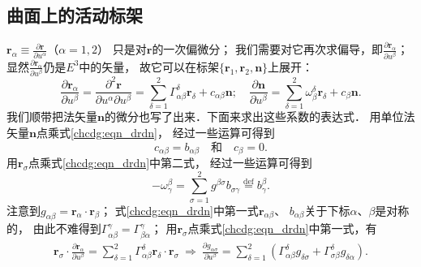 \subsection{曲面上的活动标架}
$\boldsymbol{r}_\alpha\equiv \frac{\partial \boldsymbol{r}}{\partial u^\alpha}$（$\alpha=1,2$）
只是对$\boldsymbol{r}$的一次偏微分；
我们需要对它再次求偏导，即$\frac{\partial \boldsymbol{r}_\alpha}{\partial u^\beta}$；
显然$\frac{\partial \boldsymbol{r}_\alpha}{\partial u^\beta}$仍是$E^3$中的矢量，
故它可以在标架$\{\boldsymbol{r}_1,\boldsymbol{r}_2,\boldsymbol{n}\}$上展开：
\begin{equation}\label{chcdg:eqn_drdn}
    \frac{\partial \boldsymbol{r}_\alpha}{\partial u^\beta} 
    =\frac{\partial^2 \boldsymbol{r}}{\partial u^\alpha\partial u^\beta}
    = \sum_{\delta=1}^{2} \Gamma_{\alpha \beta}^\delta \boldsymbol{r}_\delta
     + c_{\alpha \beta} \boldsymbol{n};\quad
    \frac{\partial \boldsymbol{n}}{\partial u^\beta}
     = \sum_{\delta=1}^{2} \omega^\delta_\beta \boldsymbol{r}_\delta
     + c_\beta \boldsymbol{n} .
\end{equation}
我们顺带把法矢量$\boldsymbol{n}$的微分也写了出来．下面来求出这些系数的表达式．
用单位法矢量$\boldsymbol{n}$点乘式\eqref{chcdg:eqn_drdn}，
经过一些运算可得到
\begin{equation}
    c_{\alpha\beta} = b_{\alpha\beta}  \quad\text{和}\quad c_\beta=0.
\end{equation}
用$\boldsymbol{r}_\sigma$点乘式\eqref{chcdg:eqn_drdn}中第二式，
经过一些运算可得到
\begin{equation}
    -\omega^\beta_\gamma =  \sum_{\sigma=1}^{2} g^{\beta \sigma} b_{\sigma\gamma}
     \overset{\mathrm {def}}{=}b^\beta_\gamma .
\end{equation}
注意到$g_{\alpha \beta}=\boldsymbol{r}_\alpha\cdot \boldsymbol{r}_\beta$；
式\eqref{chcdg:eqn_drdn}中第一式$\boldsymbol{r}_{\alpha \beta}$、
$b_{\alpha \beta}$关于下标$\alpha$、$\beta$是对称的，
由此不难得到$\Gamma^\gamma_{\alpha \beta}=\Gamma^\gamma_{\beta\alpha}$；
用$\boldsymbol{r}_\sigma$点乘式\eqref{chcdg:eqn_drdn}中第一式，有
\begin{align}
    \boldsymbol{r}_\sigma \cdot \frac{\partial \boldsymbol{r}_\alpha}{\partial u^\beta} 
    = \sum_{\delta=1}^{2} \Gamma_{\alpha \beta}^\delta 
    \boldsymbol{r}_\delta\cdot\boldsymbol{r}_\sigma \ \Rightarrow \ 
    \frac{\partial g_{\alpha\sigma}}{\partial u^\beta} =
    \sum_{\delta=1}^{2} \left(\Gamma_{\alpha \beta}^\delta g_{\delta \sigma}
     + \Gamma_{\sigma \beta}^\delta g_{\delta \alpha} \right) . \label{chcdg:eqn_Gg}
\end{align}

